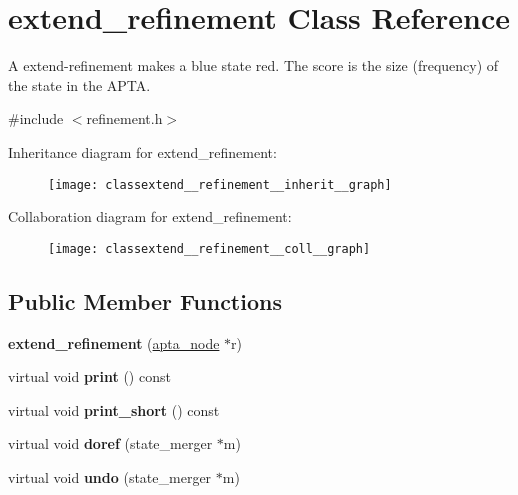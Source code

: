 \hypertarget{classextend__refinement}{}\section{extend\+\_\+refinement Class Reference}
\label{classextend__refinement}


A extend-\/refinement makes a blue state red. The score is the size (frequency) of the state in the A\+P\+TA.  




{\ttfamily \#include $<$refinement.\+h$>$}



Inheritance diagram for extend\+\_\+refinement\+:\nopagebreak
\begin{figure}[H]
\begin{center}
\leavevmode
\texttt{[image: classextend\_\_refinement\_\_inherit\_\_graph]}
\end{center}
\end{figure}


Collaboration diagram for extend\+\_\+refinement\+:\nopagebreak
\begin{figure}[H]
\begin{center}
\leavevmode
\texttt{[image: classextend\_\_refinement\_\_coll\_\_graph]}
\end{center}
\end{figure}
\subsection*{Public Member Functions}
\begin{DoxyCompactItemize}
\item 
{\bfseries extend\+\_\+refinement} (\hyperlink{classapta__node}{apta\+\_\+node} $\ast$r)\hypertarget{classextend__refinement_aa00190c7c6717a29a97f35d36e4d3ae7}{}\label{classextend__refinement_aa00190c7c6717a29a97f35d36e4d3ae7}

\item 
virtual void {\bfseries print} () const \hypertarget{classextend__refinement_a2a21165129b353dfa8d3acab801be3da}{}\label{classextend__refinement_a2a21165129b353dfa8d3acab801be3da}

\item 
virtual void {\bfseries print\+\_\+short} () const \hypertarget{classextend__refinement_afefa015267afdfa9080b1f87c12a815f}{}\label{classextend__refinement_afefa015267afdfa9080b1f87c12a815f}

\item 
virtual void {\bfseries doref} (state\+\_\+merger $\ast$m)\hypertarget{classextend__refinement_abb1a3f9c5ee0d5badace72bee46320d4}{}\label{classextend__refinement_abb1a3f9c5ee0d5badace72bee46320d4}

\item 
virtual void {\bfseries undo} (state\+\_\+merger $\ast$m)\hypertarget{classextend__refinement_a5421f88fc0063f78c8ec6887985f7e5e}{}\label{classextend__refinement_a5421f88fc0063f78c8ec6887985f7e5e}

\end{DoxyCompactItemize}
